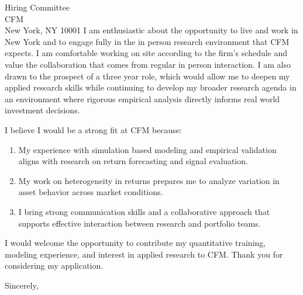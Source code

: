 \documentclass[11pt,letterpaper]{letter}
\begin{document}
\begin{letter}{Hiring Committee \\
CFM \\
New York, NY 10001}
I am enthusiastic about the opportunity to live and work in New York and to engage fully in the in person research environment that CFM expects. I am comfortable working on site according to the firm’s schedule and value the collaboration that comes from regular in person interaction. I am also drawn to the prospect of a three year role, which would allow me to deepen my applied research skills while continuing to develop my broader research agenda in an environment where rigorous empirical analysis directly informs real world investment decisions.

I believe I would be a strong fit at CFM because:
\begin{enumerate}
    \item My experience with simulation based modeling and empirical validation aligns with research on return forecasting and signal evaluation.
    \item My work on heterogeneity in returns prepares me to analyze variation in asset behavior across market conditions.
    \item I bring strong communication skills and a collaborative approach that supports effective interaction between research and portfolio teams.
\end{enumerate}

I would welcome the opportunity to contribute my quantitative training, modeling experience, and interest in applied research to CFM. Thank you for considering my application.

\closing{Sincerely,}

\end{letter}
\end{document}
